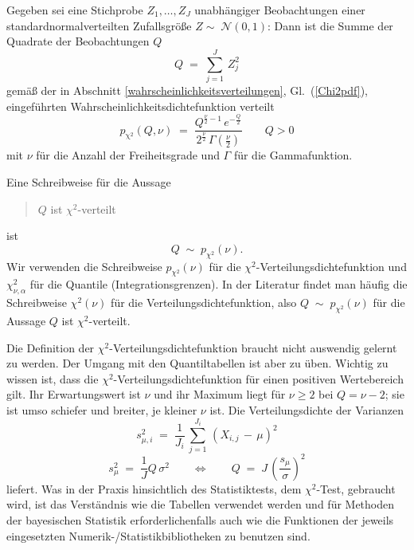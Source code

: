 Gegeben sei eine Stichprobe $Z_1, \dots, Z_J$ unabhängiger Beobachtungen einer
standardnormalverteilten Zufallsgröße $Z  \sim \; \mathcal{N}(0, 1)$:
Dann ist die Summe der Quadrate der Beobachtungen $Q$
\begin{equation}
Q \; = \; \sum_{j=1}^J \, Z_j^2
\end{equation}
gemäß der in Abschnitt \ref{wahrscheinlichkeitsverteilungen}, Gl.~(\ref{Chi2pdf}), eingeführten Wahrscheinlichkeitsdichtefunktion verteilt
\begin{equation*}
p_\mathrm{\chi^2}(Q, \nu) \; = \; \frac{Q^{\frac{\nu}{2} - 1} \,
 e^{-\frac{Q}{2}}}{2^{\frac{\nu}{2}} \, \Gamma(\frac{\nu}{2})} \qquad Q > 0
\end{equation*}
mit $\nu$ für die Anzahl der Freiheitsgrade und $\Gamma$ für die Gammafunktion.

Eine Schreibweise für die Aussage
\begin{quote}
$Q$ ist $\chi^2$-verteilt
\end{quote}
ist
\begin{equation}
Q \; \sim \; p_{\chi^2}(\nu).
\label{Chi2verteilt}
\end{equation}
Wir verwenden die Schreibweise $p_{\chi^2}(\nu)$ für die $\chi^2$-Verteilungsdichtefunktion und $\chi^2_{\nu,\alpha}$ für die Quantile (Integrationsgrenzen). In der Literatur findet man häufig die Schreibweise $\chi^2(\nu)$ für die Verteilungsdichtefunktion, also $Q \; \sim \; p_{\chi^2}(\nu)$ für die Aussage \glqq $Q$ ist $\chi^2$-verteilt\grqq.

Die Definition der $\chi^2$-Verteilungsdichtefunktion braucht nicht auswendig gelernt zu
werden. Der Umgang mit den Quantiltabellen ist aber zu üben.
Wichtig zu wissen ist, dass die $\chi^2$-Verteilungs\-dichte\-funktion für
einen positiven Wertebereich gilt. Ihr Erwartungswert ist $\nu$ und ihr Maximum liegt für
$\nu\geq2$ bei $Q=\nu-2$; sie ist umso schiefer und breiter, je kleiner $\nu$ ist.
Die Verteilungsdichte der Varianzen
\begin{equation}
s_{\mu,i}^2 \; = \; \frac{1}{J_i} \, \sum_{j=1}^{J_i} \, (X_{i,j} \, - \, \mu)^2
\end{equation}
\begin{equation}
s_{\mu}^2 \; = \; \frac{1}{J} Q \, \sigma^2  \qquad \Leftrightarrow \qquad
Q \; = \; J \, \left( \frac{s_{\mu}}{\sigma} \right)^2
\label{s2Q}
\end{equation}
liefert. Was in der Praxis hinsichtlich des Statistiktests, dem $\chi^2$-Test, gebraucht wird,
ist das Verständnis wie die Tabellen verwendet werden
und für Methoden der bayesischen Statistik erforderlichenfalls auch wie die
Funktionen der jeweils eingesetzten Numerik-/Statistik\-biblio\-theken zu benutzen sind.

